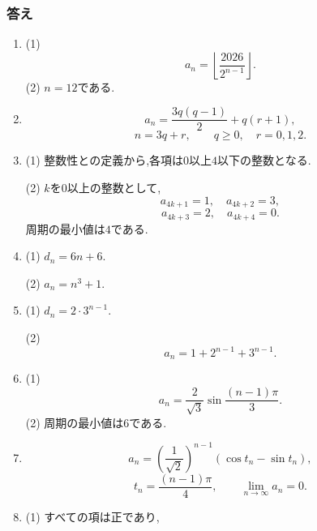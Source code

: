       \subsubsection{答え}\label{節：発展パターン・特殊性質型の演習：解答}
        \begin{enumerate}[label=\textbf{問\arabic*.},leftmargin=3.8em,format=\bookitemlink{practice-special}{answer}{problem}]
          \item (1)
                \[
                  a_n=\left\lfloor\frac{2026}{2^{n-1}}\right\rfloor.
                \]
                (2) $\displaystyle n=12$である.
          \item
                \[
                  a_n=\frac{3q(q-1)}2+q(r+1),
                \]
                \[
                  n=3q+r,\qquad q\ge0,\quad r=0,1,2.
                \]
          \item (1) 整数性との定義から,各項は$\displaystyle 0$以上$\displaystyle 4$以下の整数となる.
                \par\smallskip\noindent
                (2) $\displaystyle k$を$\displaystyle 0$以上の整数として,
                \[
                  a_{4k+1}=1,\quad a_{4k+2}=3,
                \]
                \[
                  a_{4k+3}=2,\quad a_{4k+4}=0.
                \]
                周期の最小値は$\displaystyle 4$である.
          \item (1) $\displaystyle d_n=6n+6$.
                \par\smallskip\noindent
                (2) $\displaystyle a_n=n^3+1$.
          \item (1) $\displaystyle d_n=2\cdot3^{n-1}$.
                \par\smallskip\noindent
                (2)
                \[
                  a_n=1+2^{n-1}+3^{n-1}.
                \]
          \item (1)
                \[
                  a_n=\frac2{\sqrt3}\sin\frac{(n-1)\pi}{3}.
                \]
                (2) 周期の最小値は$\displaystyle 6$である.
          \item
                \[
                  a_n=\left(\frac1{\sqrt2}\right)^{n-1}
                    \left(\cos t_n-\sin t_n\right),
                \]
                \[
                  t_n=\frac{(n-1)\pi}{4},\qquad
                  \lim_{n\to\infty}a_n=0.
                \]
          \item (1) すべての項は正であり,

\end{enumerate}
